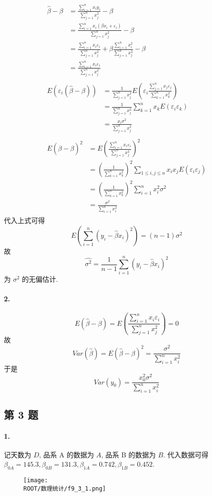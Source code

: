 \documentclass[\ROOT/main.tex]{subfiles}
\begin{document}
\begin{gather*}
    \begin{aligned}
        \widehat{\beta} - \beta
        &= \frac{\sum_{i = 1}^{n} x_i y_i}{\sum_{j = 1}^{n} x_j^2} - \beta \\
        &= \frac{\sum_{i = 1}^{n} x_i \left( \beta x_i + \varepsilon_i \right)}{\sum_{j = 1}^{n} x_j^2} - \beta \\
        &= \frac{\sum_{i = 1}^{n} x_i \varepsilon_i}{\sum_{j = 1}^{n} x_j^2} + \beta \frac{\sum_{i = 1}^{n} x_i^2}{\sum_{j = 1}^{n}x_j^2} - \beta \\
        &= \frac{\sum_{i = 1}^{n} x_i \varepsilon_i}{\sum_{j = 1}^{n} x_j^2}
    \end{aligned} \\
    \begin{aligned}
        E (\varepsilon_i (\widehat{\beta} - \beta))
        &= \frac{1}{\sum_{j = 1}^{n} x_j^2} E \left( \varepsilon_i \frac{\sum_{j = 1}^{n} x_j \varepsilon_j}{\sum_{k = 1}^{n} x_k^2} \right) \\
        &= \frac{1}{\sum_{j = 1}^{n} x_j^2} \sum_{k = 1}^{n} x_k E \left( \varepsilon_i \varepsilon_k \right) \\
        &= \frac{x_i \sigma^2}{\sum_{j = 1}^{n} x_j^2}
    \end{aligned} \\
    \begin{aligned}
        E (\widehat{\beta} - \beta)^2
        &= E \left( \frac{\sum_{i = 1}^{n} x_i \varepsilon_i}{\sum_{j = 1}^{n} x_j^2} \right)^2 \\
        &= \left( \frac{1}{\sum_{k = 1}^{n} x_k^2} \right)^2 \sum_{1 \leqslant i, j \leqslant n} x_i x_j E \left( \varepsilon_i \varepsilon_j \right) \\
        &= \left( \frac{1}{\sum_{k = 1}^{n} x_k^2} \right)^2 \sum_{i = 1}^{n} x_i^2 \sigma^2 \\
        &= \frac{\sigma^2}{\sum_{i = 1}^{n} x_i^2}
    \end{aligned}
\end{gather*}
代入上式可得
\[
    E \left( \sum_{i = 1}^{n} ( y_i - \widehat{\beta} x_i )^2 \right)
    =
    \left( n - 1 \right) \sigma^2
\]
故
\[
    \widehat{\sigma^2} = \frac{1}{n - 1} \sum_{i = 1}^{n} (y_i - \widehat{\beta} x_i)^2
\]
为 $\sigma^2$ 的无偏估计.

\noindent\paragraph*{2.}
\[
    E (\widehat{\beta} - \beta)
    = E \left( \frac{\sum_{i = 1}^{n} x_i \varepsilon_i}{\sum_{j = 1}^{n} x_j^2} \right)
    = 0
\]
故
\[
    Var (\widehat{\beta})
    = E (\widehat{\beta} - \beta)^2
    = \frac{\sigma^2}{\sum_{i = 1}^{n} x_i^2}
\]
于是
\[
    Var \left( y_0 \right)
    = \frac{x_0^2 \sigma^2}{\sum_{i = 1}^{n} x_i^2}
\]

\subsection{第 3 题}
\noindent\paragraph*{1.}
记天数为 $D$, 品系 A 的数据为 $A$, 品系 B 的数据为 $B$.
代入数据可得 $\beta_{0A} = 145.3, \beta_{0B} = 131.3, \beta_{1A} = 0.742, \beta_{1B} = 0.452$.
\begin{figure}[htpb]
    \centering
    \texttt{[image: \\ROOT/数理统计/f9\_3\_1.png]}
\end{figure}
\end{document}

